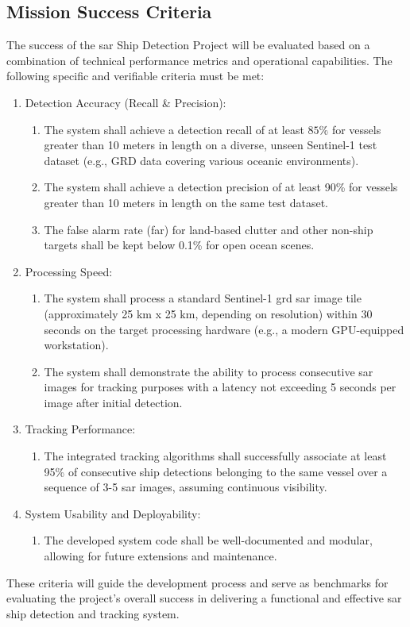 \documentclass{article}
\begin{document}
\subsection{ Mission Success Criteria}
The success of the \acrshort{sar} Ship Detection Project will be evaluated based on a combination of technical performance metrics and operational capabilities. The following specific and verifiable criteria must be met:
\begin{enumerate}
    \item Detection Accuracy (Recall \& Precision):
    \begin{enumerate}
        \item The system shall achieve a detection recall of at least $85\%$ for vessels greater than 10 meters in length on a diverse, unseen Sentinel-1 test dataset (e.g., GRD data covering various oceanic environments). \item The system shall achieve a detection precision of at least 90\% for vessels greater than 10 meters in length on the same test dataset. \item The false alarm rate (\acrshort{far}) for land-based clutter and other non-ship targets shall be kept below 0.1\% for open ocean scenes. \end{enumerate}

    \item Processing Speed:
    \begin{enumerate}
        \item The system shall process a standard Sentinel-1 \acrshort{grd} \acrshort{sar} image tile (approximately 25 km x 25 km, depending on resolution) within 30 seconds on the target processing hardware (e.g., a modern GPU-equipped workstation). \item The system shall demonstrate the ability to process consecutive \acrshort{sar} images for tracking purposes with a latency not exceeding 5 seconds per image after initial detection. \end{enumerate}

    \item Tracking Performance:
    \begin{enumerate}
        \item The integrated tracking algorithms shall successfully associate at least 95\% of consecutive ship detections belonging to the same vessel over a sequence of 3-5 \acrshort{sar} images, assuming continuous visibility. \end{enumerate}

    \item System Usability and Deployability:
    \begin{enumerate}
        \item The developed system code shall be well-documented and modular, allowing for future extensions and maintenance. \end{enumerate}
\end{enumerate}
These criteria will guide the development process and serve as benchmarks for evaluating the project's overall success in delivering a functional and effective \acrshort{sar} ship detection and tracking system. \newpage
\end{document}
